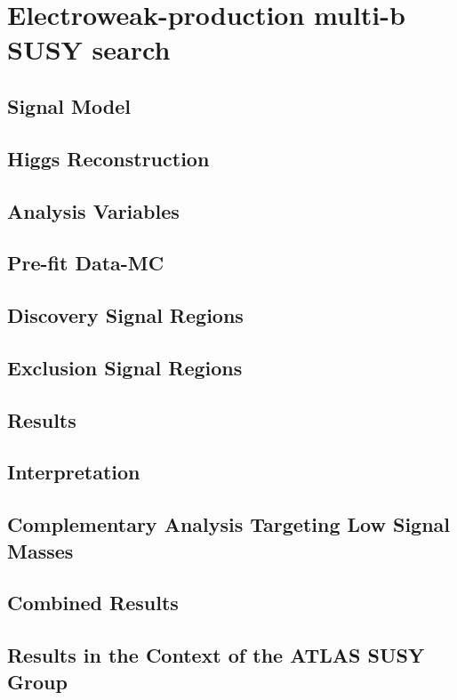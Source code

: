 \chapter{Electroweak-production multi-b SUSY search}
\label{chap:ewk_prod}


\section{Signal Model}

\section{Higgs Reconstruction}

\section{Analysis Variables}


\section{Pre-fit Data-MC}


\section{Discovery Signal Regions}


\section{Exclusion Signal Regions}


\section{Results}


\section{Interpretation}

\section{Complementary Analysis Targeting Low Signal Masses}


\section{Combined Results}

\section{Results in the Context of the ATLAS SUSY Group}